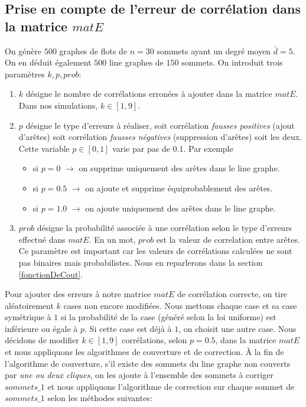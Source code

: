 \documentclass[onecolumn, 12pt]{book}
\begin{document}
\subsection{Prise en compte de l'erreur de corr\'elation dans la matrice $matE$}
On g\'en\`ere $500$ graphes de flots de $n = 30$ sommets ayant un degr\'e moyen $\bar d = 5$.
On en d\'eduit \'egalement $500$ line graphes de $150$ sommets.
On introduit trois param\`etres $k, p, prob$:
\begin{enumerate}
\item $k$ d\'esigne le nombre de corr\'elations erron\'ees \`a ajouter dans la matrice $matE$. Dans nos simulations, $k \in [1,9]$.
\item $p$ d\'esigne le type d'erreurs \`a r\'ealiser, soit corr\'elation {\em fausses positives} (ajout d'ar\^etes) soit corr\'elation {\em fausses n\'egatives} (suppression d'ar\^etes) soit les deux. Cette variable $p \in [0,1]$ varie par pas de $0.1$. Par exemple
	\begin{itemize}
	\item si $p=0$ $\rightarrow$ on supprime uniquement des ar\^etes dans le line graphe.
	\item si $p=0.5$ $\rightarrow$ on ajoute et supprime \'equiprobablement des ar\^etes.
	\item si $p=1.0$ $\rightarrow$ on ajoute uniquement des ar\^etes dans le line graphe.
	\end{itemize}
\item $prob$ d\'esigne la probabilit\'e associ\'ee \`a une corr\'elation selon le type d'erreurs effectu\'e dans $matE$. En un mot, $prob$ est la valeur de correlation entre ar\^etes.
Ce param\`etre est important car les valeurs de corr\'elations calcul\'ees  ne sont pas binaires mais probabilistes. Nous en reparlerons dans la section \ref{fonctionDeCout}.
\end{enumerate}
Pour ajouter des erreurs \`a notre matrice $matE$ de corr\'elation correcte, on tire al\'eatoirement $k$ cases non encore modifi\'ees. Nous mettons chaque case et sa case sym\'etrique \`a $1$ si la probabilit\'e de la case (g\'en\'er\'e selon la loi uniforme) est inf\'erieure ou \'egale \`a $p$. Si cette case est d\'ej\`a \`a $1$, on choisit une autre case.
\newline
Nous d\'ecidons de modifier $k \in [1, 9]$ corr\'elations, selon $p=0.5$, dans la matrice $matE$ et nous appliquons les algorithmes de couverture et de correction.
\`A la fin de l'algorithme de couverture, s'il existe des sommets du line graphe non couverts par {\em une ou deux cliques}, on les ajoute \`a l'ensemble des sommets \`a corriger $sommets\_1$ et nous appliquons l'algorithme  de correction sur chaque sommet de $sommets\_1$ selon les m\'ethodes suivantes:
\end{document}
